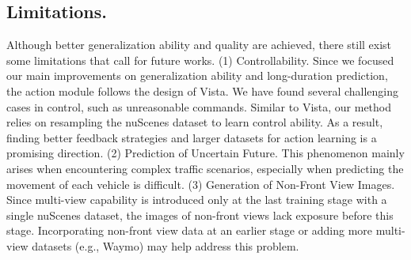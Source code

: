 \subsection{Limitations.}
Although better generalization ability and quality are achieved, there still exist some limitations that call for future works. (1) Controllability. Since we focused our main improvements on generalization ability and long-duration prediction, the action module follows the design of Vista. We have found several challenging cases in control, such as unreasonable commands. Similar to Vista, our method relies on resampling the nuScenes dataset to learn control ability. As a result, finding better feedback strategies and larger datasets for action learning is a promising direction. (2) Prediction of Uncertain Future. This phenomenon mainly arises when encountering complex traffic scenarios, especially when predicting the movement of each vehicle is difficult. (3) Generation of Non-Front View Images. Since multi-view capability is introduced only at the last training stage with a single nuScenes dataset, the images of non-front views lack exposure before this stage. Incorporating non-front view data at an earlier stage or adding more multi-view datasets (e.g., Waymo) may help address this problem.

